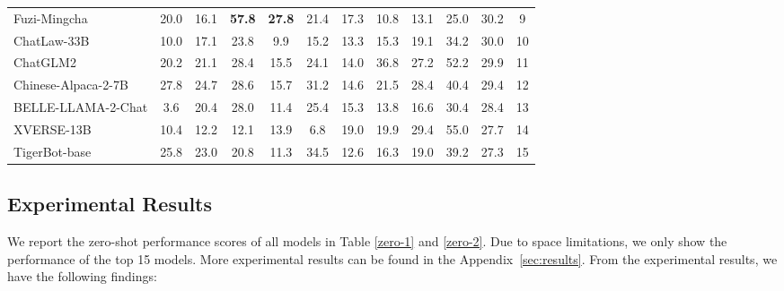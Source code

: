 \begin{table*}[t]
\begin{tabular}{l|cc|cccc|ccc|c|c}
Fuzi-Mingcha        & 20.0          & 16.1          & \textbf{57.8} & \textbf{27.8} & 21.4          & 17.3          & 10.8          & 13.1          & 25.0          & 30.2          & 9          \\
ChatLaw-33B         & 10.0          & 17.1          & 23.8          & 9.9           & 15.2          & 13.3          & 15.3          & 19.1          & 34.2          & 30.0          & 10         \\
ChatGLM2            & 20.2          & 21.1          & 28.4          & 15.5          & 24.1          & 14.0          & 36.8          & 27.2          & 52.2          & 29.9          & 11         \\
Chinese-Alpaca-2-7B & 27.8          & 24.7          & 28.6          & 15.7          & 31.2          & 14.6          & 21.5          & 28.4          & 40.4          & 29.4          & 12         \\
BELLE-LLAMA-2-Chat  & 3.6           & 20.4          & 28.0          & 11.4          & 25.4          & 15.3          & 13.8          & 16.6          & 30.4          & 28.4          & 13         \\
XVERSE-13B          & 10.4          & 12.2          & 12.1          & 13.9          & 6.8           & 19.0          & 19.9          & 29.4          & 55.0          & 27.7          & 14         \\
TigerBot-base       & 25.8          & 23.0          & 20.8          & 11.3          & 34.5          & 12.6          & 16.3          & 19.0          & 39.2          & 27.3          & 15         \\
\hline
\end{tabular}
\label{zero-2}
\end{table*}

\subsection{Experimental Results}
We report the zero-shot performance scores of all models in Table \ref{zero-1} and \ref{zero-2}. 
Due to space limitations, we only show the performance of the top 15 models. More experimental results can be found in the Appendix~\ref{sec:results}. From the experimental results, we have the following findings:

